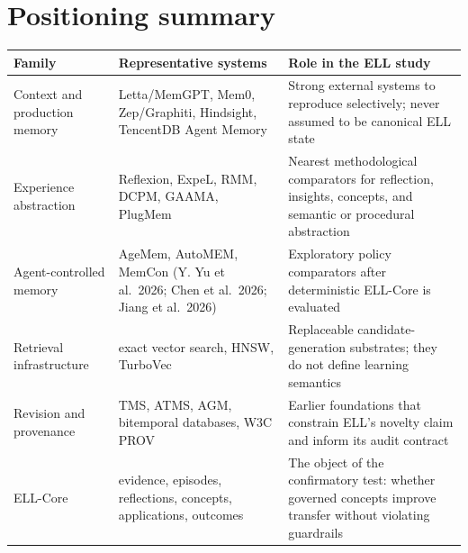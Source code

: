\documentclass[
  english,
  a4paper,
  DIV=11,
  numbers=noendperiod]{scrreprt}
\newcounter{none} %
\begin{document}
\section{Positioning summary}\label{positioning-summary}

{\def\LTcaptype{none} %
\begin{longtable}[]{@{}
  >{\raggedright\arraybackslash}p{}
  >{\raggedright\arraybackslash}p{}
  >{\raggedright\arraybackslash}p{}@{}}
\toprule\noalign{}
\begin{minipage}[b]{\linewidth}\raggedright
Family
\end{minipage} & \begin{minipage}[b]{\linewidth}\raggedright
Representative systems
\end{minipage} & \begin{minipage}[b]{\linewidth}\raggedright
Role in the ELL study
\end{minipage} \\
\midrule\noalign{}
\endhead
\bottomrule\noalign{}
\endlastfoot
Context and production memory & Letta/MemGPT, Mem0, Zep/Graphiti,
Hindsight, TencentDB Agent Memory & Strong external systems to reproduce
selectively; never assumed to be canonical ELL state \\
Experience abstraction & Reflexion, ExpeL, RMM, DCPM, GAAMA, PlugMem &
Nearest methodological comparators for reflection, insights, concepts,
and semantic or procedural abstraction \\
Agent-controlled memory & AgeMem, AutoMEM, MemCon (Y. Yu et al.~2026;
Chen et al.~2026; Jiang et al.~2026) & Exploratory policy comparators
after deterministic ELL-Core is evaluated \\
Retrieval infrastructure & exact vector search, HNSW, TurboVec &
Replaceable candidate-generation substrates; they do not define learning
semantics \\
Revision and provenance & TMS, ATMS, AGM, bitemporal databases, W3C PROV
& Earlier foundations that constrain ELL's novelty claim and inform its
audit contract \\
ELL-Core & evidence, episodes, reflections, concepts, applications,
outcomes & The object of the confirmatory test: whether governed
concepts improve transfer without violating guardrails \\
\end{longtable}
}
\end{document}
